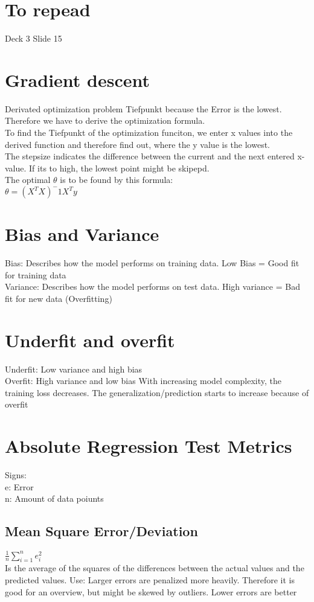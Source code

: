 \documentclass{article}
\begin{document}
\section{To repead}
Deck 3 Slide 15

\section{Gradient descent}
Derivated optimization problem Tiefpunkt because the Error is the lowest. \\
Therefore we have to derive the optimization formula. \\
To find the Tiefpunkt of the optimization funciton, we enter x values into the derived function and therefore find out, where the y value is the lowest. \\
The stepsize indicates the difference between the current and the next entered x-value. If its to high, the lowest point might be skipepd. \\
The optimal $\theta$ is to be found by this formula: \\
$\theta = (X^TX)^-1X^Ty$ 

\section{Bias and Variance}
Bias: Describes how the model performs on training data. Low Bias = Good fit for training data\\
Variance: Describes how the model performs on test data. High variance = Bad fit for new data (Overfitting) \\

\section{Underfit and overfit}
Underfit: Low variance and high bias \\
Overfit: High variance and low bias
With increasing model complexity, the training loss decreases. The generalization/prediction starts to increase because of overfit
\section{Absolute Regression Test Metrics}
Signs: \\
e: Error \\
n: Amount of data poiunts\\

\subsection{Mean Square Error/Deviation}
$\frac{1}{n} \sum_{i = 1}^{n} e_i^2 $ \\
Is the average of the squares of the differences between the actual values and the predicted values.
Use: Larger errors are penalized more heavily. Therefore it is good for an overview, but might be skewed by outliers. Lower errors are better
\end{document}
